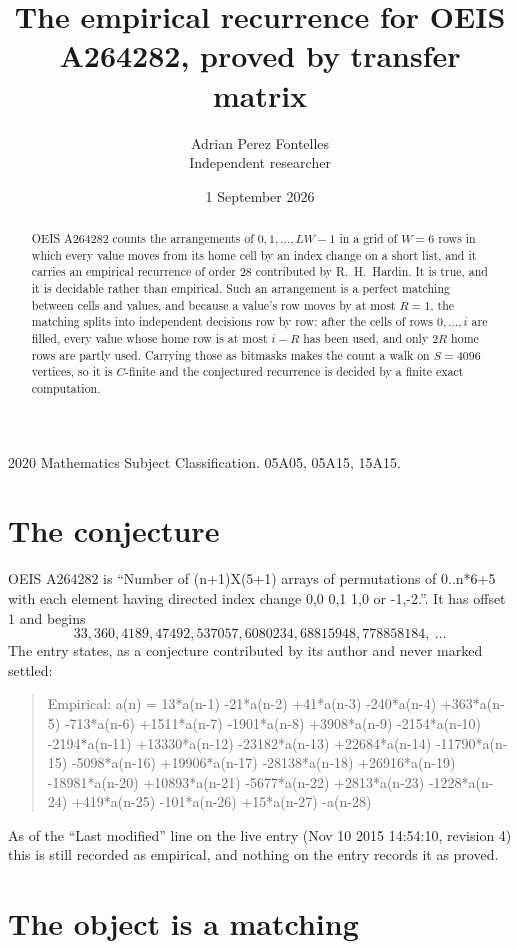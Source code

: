 \documentclass[11pt,a4paper]{article}
\title{The empirical recurrence for OEIS A264282, proved by transfer matrix}
\author{Adrian Perez Fontelles\\ \small Independent researcher}
\date{1 September 2026}
\theoremstyle{plain}
\theoremstyle{definition}
\begin{document}
\maketitle

\begin{abstract}
OEIS A264282 counts the arrangements of $0,1,\dots,LW-1$ in a grid of $W=6$ rows in which
every value moves from its home cell by an index change on a short list, and it carries an
empirical recurrence of order $28$ contributed by R.~H.~Hardin. It is true, and it is
decidable rather than empirical. Such an arrangement is a perfect matching between cells and
values, and because a value's row moves by at most $R=1$, the matching splits into
independent decisions row by row: after the cells of rows $0,\dots,i$ are filled,
every value whose home row is at most $i-R$ has been used, and only $2R$ home rows are
partly used. Carrying those as bitmasks makes the count a walk on $S=4096$ vertices, so it is
$C$-finite and the conjectured recurrence is decided by a finite exact computation.
\end{abstract}

\noindent\small 2020 Mathematics Subject Classification. 05A05, 05A15, 15A15.\normalsize

\section{The conjecture}

OEIS A264282 is ``Number of (n+1)X(5+1) arrays of permutations of 0..n*6+5 with each element having directed index change 0,0 0,1 1,0 or -1,-2.''. It has offset $1$ and begins
\[
33, 360, 4189, 47492, 537057, 6080234, 68815948, 778858184,\ \dots
\]
The entry states, as a conjecture contributed by its author and never marked settled:
\begin{quote}
Empirical: a(n) = 13*a(n-1) -21*a(n-2) +41*a(n-3) -240*a(n-4) +363*a(n-5) -713*a(n-6) +1511*a(n-7) -1901*a(n-8) +3908*a(n-9) -2154*a(n-10) -2194*a(n-11) +13330*a(n-12) -23182*a(n-13) +22684*a(n-14) -11790*a(n-15) -5098*a(n-16) +19906*a(n-17) -28138*a(n-18) +26916*a(n-19) -18981*a(n-20) +10893*a(n-21) -5677*a(n-22) +2813*a(n-23) -1228*a(n-24) +419*a(n-25) -101*a(n-26) +15*a(n-27) -a(n-28)
\end{quote}
As of the ``Last modified'' line on the live entry (Nov 10 2015 14:54:10, revision 4) this is still
recorded as empirical, and nothing on the entry records it as proved.

\section{The object is a matching}
\end{document}
